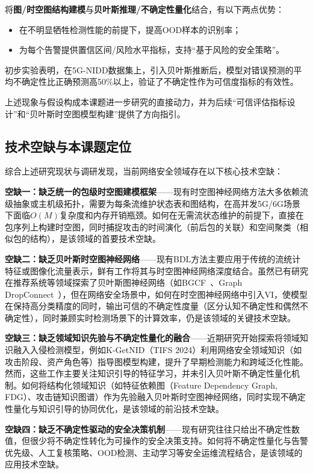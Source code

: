 将\textbf{图/时空图结构建模}与\textbf{贝叶斯推理/不确定性量化}结合，有以下两点优势：

\begin{itemize}
  \item 在不明显牺牲检测性能的前提下，提高OOD样本的识别率；
  \item 为每个告警提供置信区间/风险水平指标，支持``基于风险的安全策略''。
\end{itemize}

初步实验表明，在5G-NIDD数据集上，引入贝叶斯推断后，模型对错误预测的平均不确定性比正确预测高50\%以上，验证了不确定性作为可信度指标的有效性。

上述现象与假设构成本课题进一步研究的直接动力，并为后续``可信评估指标设计''和``贝叶斯时空图模型构建''提供了方向指引。

\subsection{技术空缺与本课题定位}

综合上述研究现状与调研发现，当前网络安全领域存在以下核心技术空缺：

\textbf{空缺一：缺乏统一的包级时空图建模框架}——现有时空图神经网络方法大多依赖流级抽象或主机级拓扑，需要为每条流维护状态表和图结构，在高并发5G/6G场景下面临$O(M)$复杂度和内存开销瓶颈。如何在无需流状态维护的前提下，直接在包序列上构建时空图，同时捕捉攻击的时间演化（前后包的关联）和空间聚类（相似包的结构），是该领域的首要技术空缺。

\textbf{空缺二：缺乏贝叶斯时空图神经网络}——现有BDL方法主要应用于传统的流统计特征或图像化流量表示，鲜有工作将其与时空图神经网络深度结合。虽然已有研究在推荐系统等领域探索了贝叶斯图神经网络（如BGCF~\cite{Sun2020}、Graph DropConnect~\cite{Hasanzadeh2020GDC}），但在网络安全场景中，如何在时空图神经网络中引入VI，使模型在保持高分类精度的同时，输出可信的不确定性度量（区分认知不确定性和偶然不确定性），同时兼顾实时检测场景下的计算效率，仍是该领域的关键技术空缺。

\textbf{空缺三：缺乏领域知识先验与不确定性量化的融合}——近期研究开始探索将领域知识融入入侵检测模型，例如K-GetNID（TIFS 2024）利用网络安全领域知识（如攻击阶段、资产角色等）指导图模型构建，提升了早期检测能力和跨域泛化性能。然而，这些工作主要关注知识引导的特征学习，并未引入贝叶斯不确定性量化机制。如何将结构化领域知识（如特征依赖图（Feature Dependency Graph, FDG）、攻击链知识图谱）作为先验融入贝叶斯时空图神经网络，同时实现不确定性量化与知识引导的协同优化，是该领域的前沿技术空缺。

\textbf{空缺四：缺乏不确定性驱动的安全决策机制}——现有研究往往只给出不确定性数值，但很少将不确定性转化为可操作的安全决策支持。如何将不确定性量化与告警优先级、人工复核策略、OOD检测、主动学习等安全运维流程结合，是该领域的应用技术空缺。

